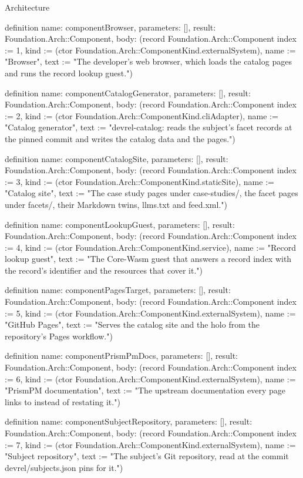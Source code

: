 \begin{lexlean}{Architecture}
\begin{semanticmodule}
definition{
  name: componentBrowser,
  parameters: [],
  result: Foundation.Arch::Component,
  body: (record Foundation.Arch::Component {index := 1, kind := (ctor Foundation.Arch::ComponentKind.externalSystem), name := "Browser", text := "The developer's web browser, which loads the catalog pages and runs the record lookup guest."})
}

definition{
  name: componentCatalogGenerator,
  parameters: [],
  result: Foundation.Arch::Component,
  body: (record Foundation.Arch::Component {index := 2, kind := (ctor Foundation.Arch::ComponentKind.cliAdapter), name := "Catalog generator", text := "devrel-catalog: reads the subject's facet records at the pinned commit and writes the catalog data and the pages."})
}

definition{
  name: componentCatalogSite,
  parameters: [],
  result: Foundation.Arch::Component,
  body: (record Foundation.Arch::Component {index := 3, kind := (ctor Foundation.Arch::ComponentKind.staticSite), name := "Catalog site", text := "The case study pages under case-studies/, the facet pages under facets/, their Markdown twins, llms.txt and feed.xml."})
}

definition{
  name: componentLookupGuest,
  parameters: [],
  result: Foundation.Arch::Component,
  body: (record Foundation.Arch::Component {index := 4, kind := (ctor Foundation.Arch::ComponentKind.service), name := "Record lookup guest", text := "The Core-Wasm guest that answers a record index with the record's identifier and the resources that cover it."})
}

definition{
  name: componentPagesTarget,
  parameters: [],
  result: Foundation.Arch::Component,
  body: (record Foundation.Arch::Component {index := 5, kind := (ctor Foundation.Arch::ComponentKind.externalSystem), name := "GitHub Pages", text := "Serves the catalog site and the holo from the repository's Pages workflow."})
}

definition{
  name: componentPrismPmDocs,
  parameters: [],
  result: Foundation.Arch::Component,
  body: (record Foundation.Arch::Component {index := 6, kind := (ctor Foundation.Arch::ComponentKind.externalSystem), name := "PrismPM documentation", text := "The upstream documentation every page links to instead of restating it."})
}

definition{
  name: componentSubjectRepository,
  parameters: [],
  result: Foundation.Arch::Component,
  body: (record Foundation.Arch::Component {index := 7, kind := (ctor Foundation.Arch::ComponentKind.externalSystem), name := "Subject repository", text := "The subject's Git repository, read at the commit devrel/subjects.json pins for it."})
}


\end{semanticmodule}
\end{lexlean}
